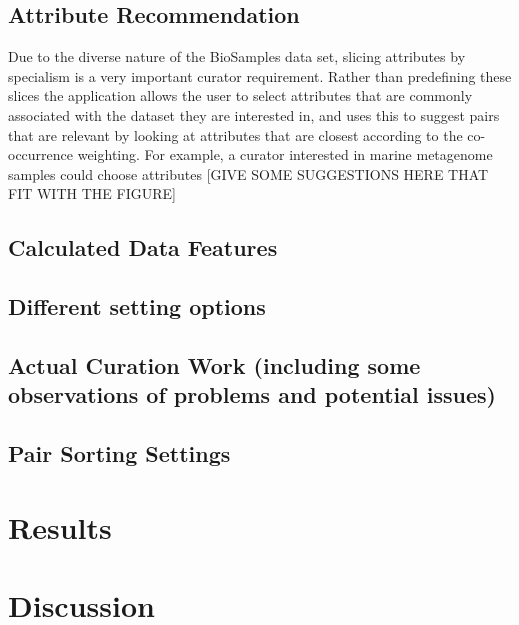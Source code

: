 \documentclass{bmcart}
\begin{document}
\subsection*{Attribute Recommendation}

Due to the diverse nature of the BioSamples data set, slicing attributes by specialism is a very important curator requirement. Rather than predefining these slices the application allows the user to select attributes that are commonly associated with the dataset they are interested in, and uses this to suggest pairs that are relevant by looking at attributes that are closest according to the co-occurrence weighting. For example, a curator interested in marine metagenome samples could choose attributes [GIVE SOME SUGGESTIONS HERE THAT FIT WITH THE FIGURE]



\subsection*{Calculated Data Features}

\subsection*{Different setting options}

\subsection*{Actual Curation Work (including some observations of problems and potential issues)}
\subsection*{Pair Sorting Settings} \label{pair_sorting_settings}

\section*{Results}



\section*{Discussion}
\end{document}
